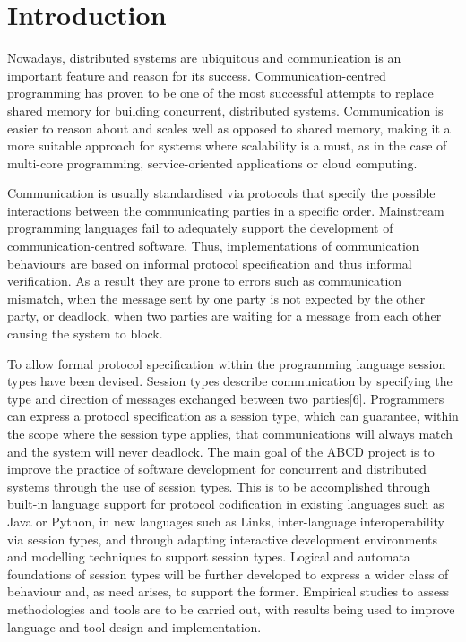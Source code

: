 \section{Introduction}


Nowadays, distributed systems are ubiquitous and communication is an important feature and reason for its success. Communication-centred programming has proven to be one of the most successful attempts to replace shared memory for building concurrent, distributed systems. Communication is easier to reason about and scales well as opposed to shared memory, making it a more suitable approach for systems where scalability is a must, as in the case of multi-core programming, service-oriented applications or cloud computing\cite{abcd}.

Communication is usually standardised via protocols that specify the possible interactions between the communicating parties in a specific order. Mainstream programming languages fail to adequately support the development of communication-centred software. Thus, implementations of communication behaviours are based on informal protocol specification and thus informal verification. As a result they are prone to errors such as communication mismatch, when the message sent by one party is not expected by the other party, or deadlock, when two parties are waiting for a message from each other causing the system to block\cite{abcd}. 

To allow formal protocol specification within the programming language session types have been devised. Session types describe communication by specifying the type and direction of messages exchanged between two parties[6]. Programmers can express a protocol specification as a session type, which can guarantee, within the scope where the session type applies, that communications will always match and the system will never deadlock.
The main goal of the ABCD project\cite{abcd} is to improve the practice of software development for concurrent and distributed systems through the use of session types. This is to be accomplished through built-in language support for protocol codification in existing languages such as Java or Python, in new languages such as Links\cite{abcd}, inter-language interoperability via session types, and through adapting interactive development environments and modelling techniques to support session types. Logical and automata foundations of session types will be further developed to express a wider class of behaviour and, as need arises, to support the former. Empirical studies to assess methodologies and tools are to be carried out, with results being used to improve language and tool design and implementation.





